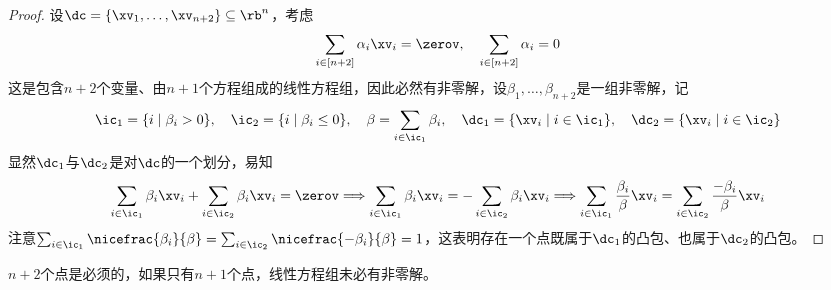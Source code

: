 \documentclass{ctexart}
\begin{document}
\begin{proof}
    设$\dc = \{ \xv_1, \ldots, \xv_{n+2} \} \subseteq \rb^n$，考虑
    \begin{align*}
        \sum_{i \in [n+2]} \alpha_i \xv_i = \zerov, \quad \sum_{i \in [n+2]} \alpha_i = 0
    \end{align*}
    这是包含$n+2$个变量、由$n+1$个方程组成的线性方程组，因此必然有非零解，设$\beta_1, \ldots, \beta_{n+2}$是一组非零解，记
    \begin{align*}
        \ic_1 = \{ i \mid \beta_i > 0 \}, \quad \ic_2 = \{ i \mid \beta_i \le 0 \}, \quad \beta = \sum_{i \in \ic_1} \beta_i, \quad \dc_1 = \{ \xv_i \mid i \in \ic_1 \}, \quad \dc_2 = \{ \xv_i \mid i \in \ic_2 \}
    \end{align*}
    显然$\dc_1$与$\dc_2$是对$\dc$的一个划分，易知
    \begin{align*}
        \sum_{i \in \ic_1} \beta_i \xv_i + \sum_{i \in \ic_2} \beta_i \xv_i = \zerov \Longrightarrow \sum_{i \in \ic_1} \beta_i \xv_i = - \sum_{i \in \ic_2} \beta_i \xv_i \Longrightarrow \sum_{i \in \ic_1} \frac{\beta_i}{\beta} \xv_i = \sum_{i \in \ic_2} \frac{-\beta_i}{\beta} \xv_i
    \end{align*}
    注意$\sum_{i \in \ic_1} \nicefrac{\beta_i}{\beta} = \sum_{i \in \ic_2} \nicefrac{-\beta_i}{\beta} = 1$，这表明存在一个点既属于$\dc_1$的凸包、也属于$\dc_2$的凸包。
\end{proof}

\begin{remark}
    $n+2$个点是必须的，如果只有$n+1$个点，线性方程组未必有非零解。
\end{remark}
\end{document}
